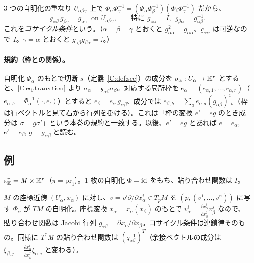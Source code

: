 3 つの自明化の重なり $U_{\alpha\beta\gamma}$ 上で $\Phi_\alpha\Phi_\gamma^{-1}=(\Phi_\alpha\Phi_\beta^{-1})(\Phi_\beta\Phi_\gamma^{-1})$ だから、
\begin{equation}\label{C:eq:cocycle}
g_{\alpha\beta}\,g_{\beta\gamma}=g_{\alpha\gamma}\ \text{ on }U_{\alpha\beta\gamma},\qquad\text{特に }g_{\alpha\alpha}=I,\ \ g_{\beta\alpha}=g_{\alpha\beta}^{-1}.
\end{equation}
これを\emph{コサイクル条件}という。（$\alpha=\beta=\gamma$ とおくと $g_{\alpha\alpha}^2=g_{\alpha\alpha}$、$g_{\alpha\alpha}$ は可逆なので $I$。$\gamma=\alpha$ とおくと $g_{\alpha\beta}g_{\beta\alpha}=I$。）

\paragraph{規約（枠との関係）。}自明化 $\Phi_\alpha$ のもとで切断 $s$（定義~\ref{C:def:sec}）の成分を $\sigma_\alpha:U_\alpha\to\mathbb K^r$ とすると、\eqref{C:eq:transition} より $\sigma_\alpha=g_{\alpha\beta}\sigma_\beta$。対応する局所枠を $e_\alpha=(e_{\alpha,1},\dots,e_{\alpha,r})$（$e_{\alpha,b}=\Phi_\alpha^{-1}(\cdot,e_b)$）とすると $e_\beta=e_\alpha\,g_{\alpha\beta}$、成分では $e_{\beta,b}=\sum_ae_{\alpha,a}(g_{\alpha\beta})^a{}_b$（枠は行ベクトルと見て右から行列を掛ける）。これは「枠の変換 $e'=eg$ のとき成分は $\sigma=g\sigma'$」という本巻の規約と一致する。以後、$e'=eg$ とあれば $e=e_\alpha$, $e'=e_\beta$, $g=g_{\alpha\beta}$ と読む。

\subsection{例}
\begin{ex}[自明束]\label{C:ex:trivial}
$\varepsilon^r_{\mathbb K}=M\times\mathbb K^r$（$\pi=\mathrm{pr}_1$）。1 枚の自明化 $\Phi=\mathrm{id}$ をもち、貼り合わせ関数は $I$。
\end{ex}

\begin{ex}[接束・余接束]\label{C:ex:TM}
$M$ の座標近傍 $(U_\alpha,x_\alpha)$ に対し、$v=v^i\partial/\partial x_\alpha^i\in T_pM$ を $(p,(v^1,\dots,v^n))$ に写す $\Phi_\alpha$ が $TM$ の自明化。座標変換 $x_\alpha=x_\alpha(x_\beta)$ のもとで $v^i_\alpha=\frac{\partial x_\alpha^i}{\partial x_\beta^j}v^j_\beta$ なので、貼り合わせ関数は Jacobi 行列 $g_{\alpha\beta}=\partial x_\alpha/\partial x_\beta$。コサイクル条件は連鎖律そのもの。同様に $T^*M$ の貼り合わせ関数は $(g_{\alpha\beta}^{-1})^T$（余接ベクトルの成分は $\xi_{\beta,j}=\frac{\partial x_\alpha^i}{\partial x_\beta^j}\xi_{\alpha,i}$ と変わる）。
\end{ex}

